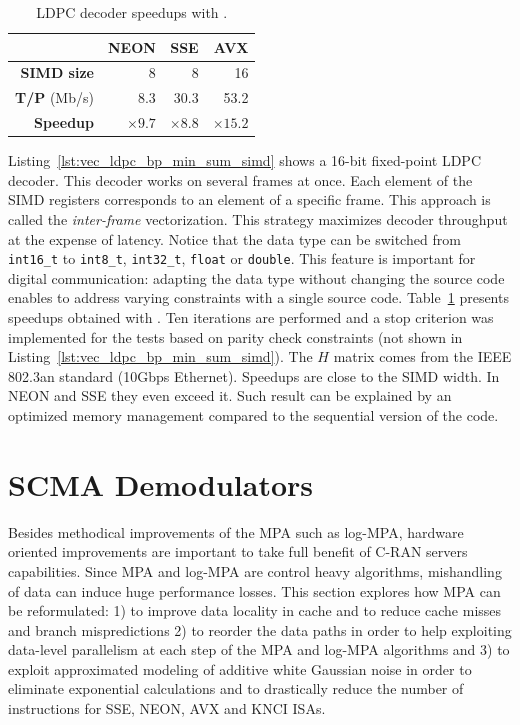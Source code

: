 \begin{table}[htp]
  \centering
  \caption{LDPC decoder speedups with \MIPP.}
  \label{tab:vec_ldpc_speedup}
  \begin{tabular}{r| r r r}
                      & \textbf{NEON} & \textbf{SSE} & \textbf{AVX}  \\ \hline \hline
  \textbf{SIMD size}  & 8             & 8            & 16            \\ %
  \textbf{T/P} (Mb/s) & 8.3           & 30.3         & 53.2          \\ %
  \textbf{Speedup}    & $\times 9.7$  & $\times 8.8$ & $\times 15.2$ \\
  \end{tabular}
\end{table}

Listing~\ref{lst:vec_ldpc_bp_min_sum_simd} shows a 16-bit fixed-point LDPC
decoder. This decoder works on several frames at once. Each element of the SIMD
registers corresponds to an element of a specific frame. This approach is called
the \textit{inter-frame} vectorization. This strategy maximizes decoder
throughput at the expense of latency. Notice that the data type can be switched
from \verb|int16_t| to \verb|int8_t|, \verb|int32_t|, \verb|float| or
\verb|double|. This \MIPP feature is important for digital communication:
adapting the data type without changing the source code enables to address
varying constraints with a single source code. Table~\ref{tab:vec_ldpc_speedup}
presents speedups obtained with \MIPP. Ten iterations are performed and a stop
criterion was implemented for the tests based on parity check constraints (not
shown in Listing~\ref{lst:vec_ldpc_bp_min_sum_simd}). The $H$ matrix comes from
the IEEE 802.3an standard (10Gbps Ethernet). Speedups are close to the SIMD
width. In NEON and SSE they even exceed it. Such result can be explained by an
optimized memory management compared to the sequential version of the code.

\section{SCMA Demodulators}
\label{sec:opt_scma}

Besides methodical improvements of the MPA such as log-MPA, hardware oriented
improvements are important to take full benefit of C-RAN servers capabilities.
Since MPA and log-MPA are control heavy algorithms, mishandling of data can
induce huge performance losses. This section explores how MPA can be
reformulated: 1) to improve data locality in cache and to reduce cache misses
and branch mispredictions 2) to reorder the data paths in order to help
exploiting data-level parallelism at each step of the MPA and log-MPA algorithms
and 3) to exploit approximated modeling of additive white Gaussian noise in
order to eliminate exponential calculations and to drastically reduce the number
of instructions for SSE, NEON, AVX and KNCI ISAs.


